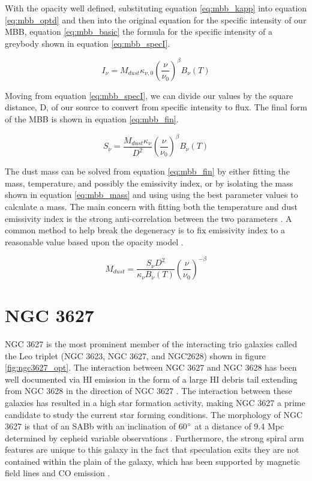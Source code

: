 With the opacity well defined, substituting equation \ref{eq:mbb_kapp} into equation \ref{eq:mbb_optd} and then into the original equation for the specific intensity of our MBB, equation \ref{eq:mbb_basic} the formula for the specific intensity of a greybody shown in equation \ref{eq:mbb_specI}.

\begin{equation}\label{eq:mbb_specI}
  I_\nu=M_{dust}\kappa_{\nu,0}\left(\frac{\nu}{\nu_0}\right)^\beta B_\nu\left(T\right)
\end{equation}

Moving from equation \ref{eq:mbb_specI}, we can divide our values by the square distance, D, of our source to convert from specific intensity to flux.  The final form of the MBB is shown in equation \ref{eq:mbb_fin}.

\begin{equation}\label{eq:mbb_fin}
  S_\nu=\frac{M_{dust}\kappa_\nu}{D^2}\left(\frac{\nu}{\nu_0}\right)^\beta B_\nu\left(T\right)
\end{equation}

The dust mass can be solved from equation \ref{eq:mbb_fin} by either fitting the mass, temperature, and possibly the emissivity index, or by isolating the mass shown in equation \ref{eq:mbb_mass} and using using the best parameter values to calculate a mass.  The main concern with fitting both the temperature and dust emissivity index is the strong anti-correlation between the two parameters \citep{galametz2012,tabatabaei2014}.  A common method to help break the degeneracy is to fix emissivity index to a reasonable value based upon the opacity model \citep{tabatabaei2014}.

\begin{equation}\label{eq:mbb_mass}
  M_{dust} = \frac{S_\nu D^2}{\kappa_\nu B_\nu\left(T\right)}\left(\frac{\nu}{\nu_0}\right)^{-\beta}
\end{equation}

\section{NGC 3627}
NGC 3627 is the most prominent member of the interacting trio galaxies called the Leo triplet (NGC 3623, NGC 3627,  and NGC2628) shown in figure \ref{fig:ngc3627_opt}.  The interaction between NGC 3627 and NGC 3628 has been well documented via HI emission in the form of a large HI debris tail extending from NGC 3628 in the direction of NGC 3627 \citep{rots1978,haynes1979}.  The interaction between these galaxies has resulted in a high star formation activity, making NGC 3627 a prime candidate to study the current star forming conditions.  The morphology of NGC 3627 is that of an SABb with an inclination of 60$\degree$ \citep{reuter1996} at a distance of 9.4 Mpc determined by cepheid variable observations \citep{kennicutt2011}.  Furthermore, the strong spiral arm features are unique to this galaxy in the fact that speculation exits they are not contained within the plain of the galaxy, which has been supported by magnetic field lines \citep{soida2001} and CO emission \citep{dumke2011}.

